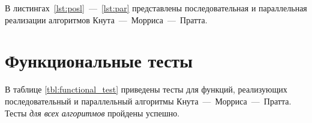 В листингах~\ref{lst:posl}~---~\ref{lst:par} представлены последовательная и параллельная реализации алгоритмов Кнута~---~Морриса~---~Пратта.









\section{Функциональные тесты}

В таблице \ref{tbl:functional_test} приведены тесты для функций, реализующих последовательный и параллельный алгоритмы Кнута~---~Морриса~---~Пратта. Тесты \textit{для всех алгоритмов} пройдены успешно. 

